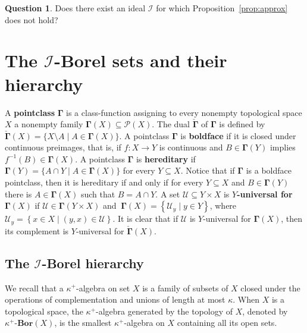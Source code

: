 \documentclass{amsart}
\numberwithin{equation}{section}
\newcommand{\I}{\mathcal{I}}
\newcommand{\U}{\mathcal{U}}
\newcommand{\markdef}[1]{\textbf{#1}}
\newcommand{\1}{\mathbf{I}}
\newcommand{\2}{\mathbf{II}}
\newcommand{\Bor}{\k^+\text{-}\mathbf{Bor}}
\renewcommand{\a}{\alpha}
\renewcommand{\k}{\kappa}
\newcommand{\pow}{\mathscr{P}}
\theoremstyle{definition}
\newtheorem{question}[theorem]{Question}
\theoremstyle{remark}
\begin{document}
\begin{question}
Does there exist an ideal \(\I\) for which Proposition~\ref{prop:approx} does not hold?
\end{question}

\section{The \(\I\)-Borel sets and their hierarchy}\label{section_hierarchy}
A \markdef{pointclass} \(\boldsymbol\Gamma\) is a class-function assigning to every nonempty topological space $X$ a nonempty family \(\boldsymbol\Gamma(X) \subseteq \pow(X)\). The dual $\check{\boldsymbol\Gamma}$ of \( \boldsymbol{\Gamma}\) is defined by $\check{\boldsymbol\Gamma}(X)= \{X \setminus A \mid A \in \boldsymbol\Gamma(X)\}$. A pointclass \(\boldsymbol{\Gamma}\) is \markdef{boldface} if it is closed under continuous preimages, that is, if $f \colon X \to Y$ is continuous and $B \in \boldsymbol\Gamma(Y)$ implies $f^{-1}(B) \in \boldsymbol\Gamma(X)$.  A pointclass \( \boldsymbol{\Gamma} \) is \markdef{hereditary} if \( \boldsymbol{\Gamma}(Y) = \{ A \cap Y \mid A \in \boldsymbol{\Gamma}(X) \} \) for every \( Y \subseteq X \). Notice that if \( \boldsymbol{\Gamma}\) is a boldface pointclass, then it is hereditary if and only if for every \( Y \subseteq X \) and \( B \in \boldsymbol{\Gamma}(Y) \) there is \( A \in \boldsymbol{\Gamma}(X) \) such that \( B = A \cap Y \). 
A set \(\U \subseteq Y \times X \) is \markdef{$Y$-universal for \(\boldsymbol{\Gamma}(X)\)} if \( \U \in \boldsymbol{\Gamma}(Y \times X) \) and \(\ \boldsymbol{\Gamma}(X)=\left\{ \U_y \mid y \in Y\right \} \), where \(\U_y= \left\{ x \in X \mid (y,x) \in \U \right\} \). It is clear that if \(\U\) is $Y$-universal for \(\boldsymbol{\Gamma}(X)\), then its complement is $Y$-universal for \(\check{\boldsymbol{\Gamma}}(X)\).

\subsection{The \(\I\)-Borel hierarchy}
We recall that a \( \k^+ \)-algebra on set \(X \) is a family of subsets of $X $ closed under the operations of complementation and unions of length at most \( \k\). When $X$ is a topological space, the $\k^+$-algebra generated by the topology of $X$, denoted by \(\Bor(X)\), is the smallest $\k^+$-algebra on $X$ containing all its open sets.
\end{document}
